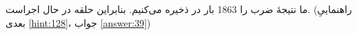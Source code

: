 \section{}
\paragraph{}\label{hint:331}
ما نتیجهٔ ضرب را 1863 بار در  ذخیره می‌کنیم. بنابراین حلقه در حال اجراست. (راهنماییِ بعدی \ref{hint:128}، جواب \ref{answer:39})